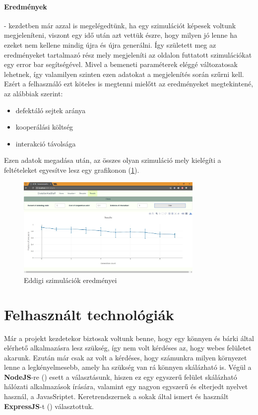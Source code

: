 \paragraph{Eredmények}- kezdetben már azzal is megelégedtünk, ha egy szimulációt képesek voltunk megjeleníteni, viszont egy idő után azt vettük észre, hogy milyen jó lenne ha ezeket nem kellene mindig újra és újra generálni. Így született meg az eredményeket tartalmazó rész mely megjeleníti az oldalon futtatott szimulációkat egy error bar segítségével. Mivel a bemeneti paraméterek eléggé változatosak lehetnek, így valamilyen szinten ezen adatokat a megjelenítés során szűrni kell. Ezért a felhasználó ezt köteles is megtenni mielőtt az eredményeket megtekintené, az alábbiak szerint:
\begin{itemize}[noitemsep]
	\item defektáló sejtek aránya
	\item kooperálási költség 
	\item interakció távolsága
\end{itemize}
Ezen adatok megadása után, az összes olyan szimuláció mely kielégíti a feltételeket egyesítve lesz egy grafikonon (\ref{fig:SimulationResults}).

\begin{figure}[ht!]
	\centering
	\includegraphics[width=90mm]{images/SimulationResults}
	\caption{Eddigi szimulációk eredményei}
	\label{fig:SimulationResults}
\end{figure}


\section{Felhasznált technológiák}

Már a projekt kezdetekor biztosak voltunk benne, hogy egy könnyen és bárki által elérhető alkalmazásra lesz szükség, így nem volt kérdéses az, hogy webes felületet akarunk. Ezután már csak az volt a kérdéses, hogy számunkra milyen környezet lenne a legkényelmesebb, amely ha szükség van rá könnyen skálázható is. Végül a \textbf{NodeJS}-re (\cite{soft:node}) esett a választásunk, hiszen ez egy egyszerű felület skálázható hálózati alkalmazások írására, valamint egy nagyon egyszerű és elterjedt nyelvet használ, a JavasSriptet. Keretrendszernek a sokak által ismert és használt \textbf{ExpressJS}-t (\cite{soft:express}) választottuk.

